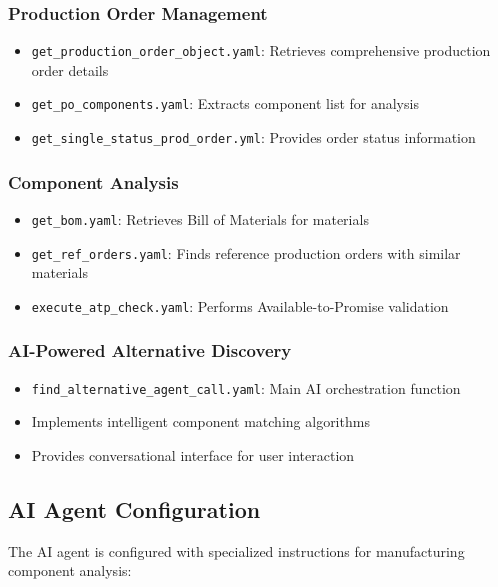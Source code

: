 \subsubsection{Production Order Management}
\begin{itemize}
    \item \texttt{get\_production\_order\_object.yaml}: Retrieves comprehensive production order details
    \item \texttt{get\_po\_components.yaml}: Extracts component list for analysis
    \item \texttt{get\_single\_status\_prod\_order.yml}: Provides order status information
\end{itemize}

\subsubsection{Component Analysis}
\begin{itemize}
    \item \texttt{get\_bom.yaml}: Retrieves Bill of Materials for materials
    \item \texttt{get\_ref\_orders.yaml}: Finds reference production orders with similar materials
    \item \texttt{execute\_atp\_check.yaml}: Performs Available-to-Promise validation
\end{itemize}

\subsubsection{AI-Powered Alternative Discovery}
\begin{itemize}
    \item \texttt{find\_alternative\_agent\_call.yaml}: Main AI orchestration function
    \item Implements intelligent component matching algorithms
    \item Provides conversational interface for user interaction
\end{itemize}

\subsection{AI Agent Configuration}

The AI agent is configured with specialized instructions for manufacturing component analysis:

